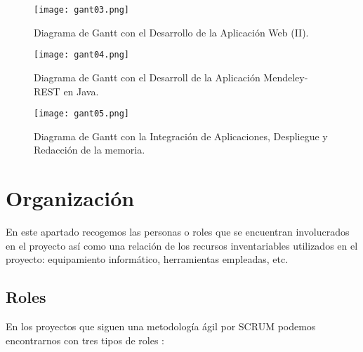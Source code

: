 \begin{figure}[h!]
	\begin{center}
		\texttt{[image: gant03.png]}
		\caption{Diagrama de Gantt con el Desarrollo de la Aplicación Web (II).}
		\label{fig:gantt03}
	\end{center}
\end{figure}

\begin{figure}[h!]
	\begin{center}
		\texttt{[image: gant04.png]}
		\caption{Diagrama de Gantt con el Desarroll de la Aplicación Mendeley-REST en Java.}
		\label{fig:gantt04}
	\end{center}
\end{figure}

\begin{figure}[h!]
	\begin{center}
		\texttt{[image: gant05.png]}
		\caption{Diagrama de Gantt con la Integración de Aplicaciones, Despliegue y Redacción de la memoria.}
		\label{fig:gantt05}
	\end{center}
\end{figure}





\section{Organización}
En este apartado recogemos las personas o roles que se encuentran involucrados en el proyecto así como una relación de los recursos inventariables utilizados en el proyecto: equipamiento informático, herramientas empleadas, etc.

\subsection{Roles}
En los proyectos que siguen una metodología ágil por SCRUM podemos encontrarnos con tres tipos de roles \cite{scrum2016}:

